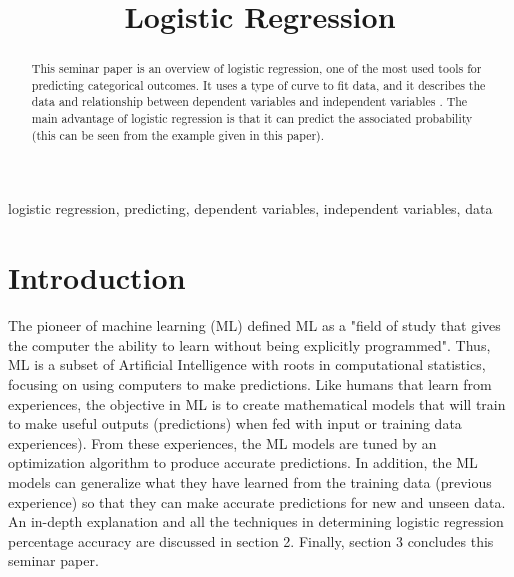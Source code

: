 \documentclass[conference]{IEEEtran}
\begin{document}
\title{Logistic Regression\\
}

\author{
}

\maketitle

\begin{abstract}
This seminar paper is an overview of logistic regression, one of the most used tools for predicting categorical outcomes. 
It uses a type of curve to fit data, and it describes the data and relationship between dependent variables and independent variables \cite{ab2}.
The main advantage of logistic regression is that it can predict the associated probability (this can be seen from the example given in this paper).
\end{abstract}

\begin{IEEEkeywords}
logistic regression, predicting, dependent variables, independent variables, data
\end{IEEEkeywords}

\section{Introduction}
The pioneer of machine learning (ML) defined ML as a "field of study that gives the computer the ability to learn without being explicitly programmed"\cite{bb1}. Thus, ML is a subset of Artificial Intelligence with roots in computational statistics, focusing on using computers to make predictions. Like humans that learn from experiences, the objective in ML is to create mathematical models that will train to make useful outputs (predictions) when fed with input or training data experiences). From these experiences, the ML models are tuned by an optimization
algorithm to produce accurate predictions. In addition, the ML models can generalize what they have learned from the training data (previous experience) so that they can make accurate predictions for new and unseen data\cite{bb2}.
An in-depth explanation and all the techniques in determining logistic regression percentage accuracy are discussed in section 2. Finally, section 3 concludes this seminar paper. 
\end{document}
